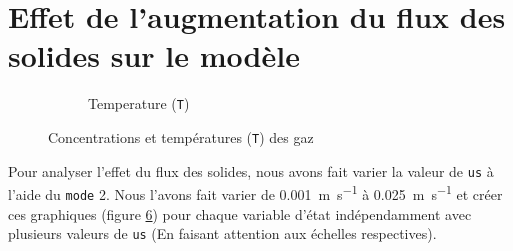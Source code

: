\documentclass[11pt]{report}
\begin{document}
    \section{Effet de l'augmentation du flux des solides sur le modèle}
      \begin{figure}[ht]
        \centering
        \begin{subfigure}[t]{0.325\textwidth}
          \centering
          
          \caption{}
          \label{graph:con:2:CH4}
        \end{subfigure}
        \hfill
        \begin{subfigure}[t]{0.325\textwidth}
          \centering
          
          \caption{}
          \label{graph:con:2:H2}
        \end{subfigure}
        \hfill
        \begin{subfigure}[t]{0.325\textwidth}
          \centering
          
          \caption{}
          \label{graph:con:2:CO}
        \end{subfigure}
        \hfill
        \begin{subfigure}[t]{0.325\textwidth}
          \centering
          
          \caption{}
          \label{graph:con:2:CO2}
        \end{subfigure}
        \begin{subfigure}[t]{0.325\textwidth}
          \centering
          
          \caption{Temperature (\texttt{T})}
          \label{graph:con:2:T}
        \end{subfigure}
        \caption{Concentrations et températures (\texttt{T}) des gaz}
        \label{graph:con:2}
      \end{figure}
      Pour analyser l'effet du flux des solides,
      nous avons fait varier la valeur de \verb|us| à l'aide du \verb|mode| 2.
      Nous l'avons fait varier de \SI{0.001}{\meter\per\second} à \SI{0.025}{\meter\per\second}
      et créer ces graphiques (figure \ref{graph:con:2}) pour chaque variable d'état 
      indépendamment avec plusieurs valeurs de \verb|us| (En faisant attention aux échelles respectives).
\end{document}
